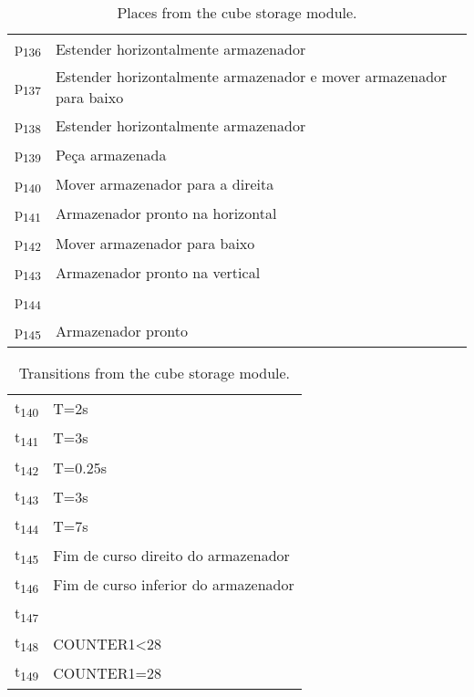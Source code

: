\begin{table}[htbp]
\caption{Places from the cube storage module.}
\centering
\begin{tabular}{ll}
p\textsubscript{136} & Estender horizontalmente armazenador\\
p\textsubscript{137} & Estender horizontalmente armazenador e mover armazenador para baixo\\
p\textsubscript{138} & Estender horizontalmente armazenador\\
p\textsubscript{139} & Peça armazenada\\
p\textsubscript{140} & Mover armazenador para a direita\\
p\textsubscript{141} & Armazenador pronto na horizontal\\
p\textsubscript{142} & Mover armazenador para baixo\\
p\textsubscript{143} & Armazenador pronto na vertical\\
p\textsubscript{144} & \\
p\textsubscript{145} & Armazenador pronto\\
\end{tabular}
\end{table}

\begin{table}[htbp]
\caption{Transitions from the cube storage module.}
\centering
\begin{tabular}{ll}
t\textsubscript{140} & T=2s\\
t\textsubscript{141} & T=3s\\
t\textsubscript{142} & T=0.25s\\
t\textsubscript{143} & T=3s\\
t\textsubscript{144} & T=7s\\
t\textsubscript{145} & Fim de curso direito do armazenador\\
t\textsubscript{146} & Fim de curso inferior do armazenador\\
t\textsubscript{147} & \\
t\textsubscript{148} & COUNTER1<28\\
t\textsubscript{149} & COUNTER1=28\\
\end{tabular}
\end{table}
